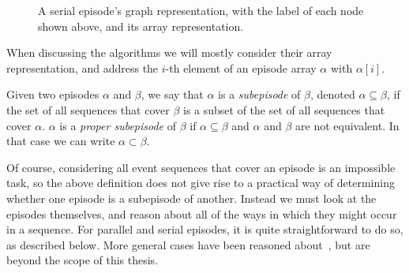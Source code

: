 \begin{figure}[h]
\centering


\caption{A serial episode's graph representation, with the label of each node shown above, and its array representation.}
\label{fig:serial-representation}
\end{figure}

When discussing the algorithms we will mostly consider their array representation, and address the $ i $-th element of an episode array $ \alpha $ with $ \alpha [i] $.

\begin{definition}
Given two episodes $ \alpha $ and $ \beta $, we say that $ \alpha $ is a \emph{subepisode} of $ \beta $, denoted $ \alpha \subseteq \beta $, if the set of all sequences that cover $ \beta $ is a subset of the set of all sequences that cover $ \alpha $. $ \alpha $ is a \emph{proper subepisode} of $ \beta $ if $ \alpha \subseteq \beta $ and $ \alpha $ and $ \beta $ are not equivalent. In that case we can write $ \alpha \subset \beta $.
\end{definition}

Of course, considering all event sequences that cover an episode is an impossible task, so the above definition does not give rise to a practical way of determining whether one episode is a subepisode of another. Instead we must look at the episodes themselves, and reason about all of the ways in which they might occur in a sequence. For parallel and serial episodes, it is quite straightforward to do so, as described below. More general cases have been reasoned about~\cite{tatti2012mining}, but are beyond the scope of this thesis.

